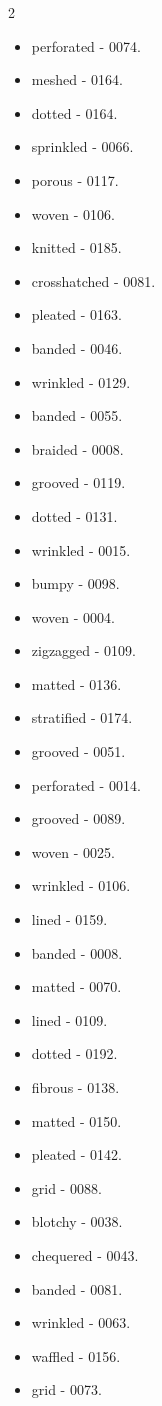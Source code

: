 \begin{multicols}{2}
\begin{itemize}
\item perforated - 0074.
\item meshed - 0164.
\item dotted - 0164.
\item sprinkled - 0066.
\item porous - 0117.
\item woven - 0106.
\item knitted - 0185.
\item crosshatched - 0081.
\item pleated - 0163.
\item banded - 0046.
\item wrinkled - 0129.
\item banded - 0055.
\item braided - 0008.
\item grooved - 0119.
\item dotted - 0131.
\item wrinkled - 0015.
\item bumpy - 0098.
\item woven - 0004.
\item zigzagged - 0109.
\item matted - 0136.
\item stratified - 0174.
\item grooved - 0051.
\item perforated - 0014.
\item grooved - 0089.
\item woven - 0025.
\item wrinkled - 0106.
\item lined - 0159.
\item banded - 0008.
\item matted - 0070.
\item lined - 0109.
\item dotted - 0192.
\item fibrous - 0138.
\item matted - 0150.
\item pleated - 0142.
\item grid - 0088.
\item blotchy - 0038.
\item chequered - 0043.
\item banded - 0081.
\item wrinkled - 0063.
\item waffled - 0156.
\item grid - 0073.

\end{itemize}
\end{multicols}
